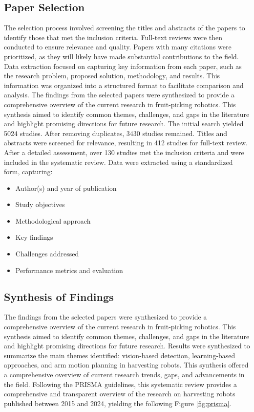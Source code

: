 \documentclass[a4paper,fleqn]{cas-dc}
\begin{document}
\subsection{Paper Selection}
The selection process involved screening the titles and abstracts of the papers to identify those that met the inclusion criteria. Full-text reviews were then conducted to ensure relevance and quality. Papers with many citations were prioritized, as they will likely have made substantial contributions to the field.
Data extraction focused on capturing key information from each paper, such as the research problem, proposed solution, methodology, and results. This information was organized into a structured format to facilitate comparison and analysis.
The findings from the selected papers were synthesized to provide a comprehensive overview of the current research in fruit-picking robotics. This synthesis aimed to identify common themes, challenges, and gaps in the literature and highlight promising directions for future research.
The initial search yielded 5024 studies. After removing duplicates, 3430 studies remained. Titles and abstracts were screened for relevance, resulting in 412 studies for full-text review. After a detailed assessment, over 130 studies met the inclusion criteria and were included in the systematic review.
Data were extracted using a standardized form, capturing:
\begin{itemize}
    \item Author(s) and year of publication
    \item Study objectives
    \item Methodological approach
    \item Key findings
    \item Challenges addressed
    \item Performance metrics and evaluation
\end{itemize}

\subsection{Synthesis of Findings}
The findings from the selected papers were synthesized to provide a comprehensive overview of the current research in fruit-picking robotics. This synthesis aimed to identify common themes, challenges, and gaps in the literature and highlight promising directions for future research.
Results were synthesized to summarize the main themes identified: vision-based detection, learning-based approaches, and arm motion planning in harvesting robots. This synthesis offered a comprehensive overview of current research trends, gaps, and advancements in the field.
Following the PRISMA guidelines, this systematic review provides a comprehensive and transparent overview of the research on harvesting robots published between 2015 and 2024, yielding the following Figure \ref{fig:prisma}.
\end{document}
